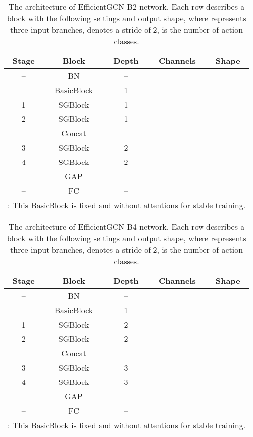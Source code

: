 \documentclass[10pt,journal,compsoc]{IEEEtran}
\begin{document}
\begin{table}[ht]
  \vspace{-0.4cm}
  \caption{The architecture of EfficientGCN-B2 network. Each row describes a block with the following settings and output shape, where  represents three input branches,  denotes a stride of 2,  is the number of action classes.}
  \label{tab:architecture2}
  \vspace{-0.4cm}
  \centering
  \setlength{\tabcolsep}{4pt}
  \renewcommand{\arraystretch}{1.2}
  \begin{tabular}{ccccc}
  \toprule
  Stage & Block & Depth & Channels & Shape \\
  \midrule
  -- & BN & -- &  &  \\
  -- & BasicBlock & 1 &  &  \\
  \hline
  1 & SGBlock & 1 &  &  \\
  2 & SGBlock & 1 &  &  \\
  \hline
  -- & Concat & -- &  &  \\
  \hline
  3 & SGBlock & 2 &  &  \\
  4 & SGBlock & 2 &  &  \\
  \hline
  -- & GAP & -- &  &  \\
  \hline
  -- & FC & -- &  &  \\
  \bottomrule
  \multicolumn{5}{l}{: This BasicBlock is fixed and without attentions for stable training.}\\
  \end{tabular}
\end{table}

\begin{table}[ht]
  \caption{The architecture of EfficientGCN-B4 network. Each row describes a block with the following settings and output shape, where  represents three input branches,  denotes a stride of 2,  is the number of action classes.}
  \label{tab:architecture4}
  \vspace{-0.4cm}
  \centering
  \setlength{\tabcolsep}{4pt}
  \renewcommand{\arraystretch}{1.2}
  \begin{tabular}{ccccc}
  \toprule
  Stage & Block & Depth & Channels & Shape \\
  \midrule
  -- & BN & -- &  &  \\
  -- & BasicBlock & 1 &  &  \\
  \hline
  1 & SGBlock & 2 &  &  \\
  2 & SGBlock & 2 &  &  \\
  \hline
  -- & Concat & -- &  &  \\
  \hline
  3 & SGBlock & 3 &  &  \\
  4 & SGBlock & 3 &  &  \\
  \hline
  -- & GAP & -- &  &  \\
  \hline
  -- & FC & -- &  &  \\
  \bottomrule
  \multicolumn{5}{l}{: This BasicBlock is fixed and without attentions for stable training.}\\
  \end{tabular}
\end{table}
\end{document}
